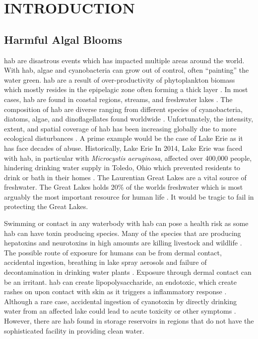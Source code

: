 
\chapter{INTRODUCTION}


\section{Harmful Algal Blooms}




\gls{hab} are disastrous events which has impacted multiple areas around the world. With \gls{hab}, algae and cyanobacteria can grow out of control, often ``painting'' the water green. \gls{hab} are a result of over-productivity of phytoplankton biomass which mostly resides in the epipelagic zone often forming a thick layer \cite{moore_richard_cyanobacterial_1993}.  In most cases, \gls{hab} are found in coastal regions, streams, and freshwater lakes \cite{rastogi_cyanotoxin-microcystins:_2014}. The composition of
\gls{hab} are diverse ranging from  different species of cyanobacteria, diatoms, algae, and dinoflagellates found worldwide \cite{dittmann_cyanobacterial_2012}.  Unfortunately, the intensity, extent, and spatial coverage of \gls{hab} has been increasing globally due to more ecological disturbances \cite{codd_cyanobacterial_1999}. A prime example would be the case of Lake Erie as it has face decades of abuse. Historically, Lake Erie  In 2014, Lake Erie was faced with \gls{hab}, in particular with \emph{Microcystis aeruginosa}, affected over 400,000 people, hindering drinking water supply in Toledo, Ohio which prevented residents to drink or bath in their homes \cite{mann_toledo_2014}.
The Laurentian Great Lakes are a vital source of freshwater. The Great Lakes holds 20\% of the worlds freshwater which is most arguably the most important resource for human life \cite{carmichael_health_2016}. It would be tragic to fail in protecting the Great Lakes.



Swimming or contact in any waterbody with \gls{hab} can pose a health risk as some \gls{hab} can have toxin producing species. Many of the species that are producing hepatoxins and neurotoxins in high amounts are killing livestock and wildlife \cite{anderson_harmful_2002}. The possible route of exposure  for humans can be from dermal contact, accidental ingestion, breathing in lake spray aerosols and failure of decontamination in drinking water plants \cite{may_aerosol_2018,codd_cyanobacterial_1999}. Exposure through dermal contact can be an irritant. \gls{hab} can create lipopolysaccharide, an endotoxic, which create rashes on upon contact with skin as it triggers a inflammatory response \cite{ moore_richard_cyanobacterial_1993}. Although a rare case, accidental ingestion of cyanotoxin by directly drinking water from an affected lake could  lead to acute toxicity or other symptoms \cite{monks_potent_2007}. However, there are \gls{hab} found in storage reservoirs in regions that do not have the sophisticated facility in providing clean water.

